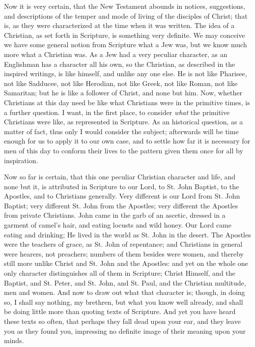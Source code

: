 Now it is very certain, that the New Testament abounds in notices,
suggestions, and descriptions of the temper and mode of living of the
disciples of Christ; that is, as they were characterized at the time
when it was written. The idea of a Christian, as set forth in
Scripture, is something very definite. We may conceive we have some
general notion from Scripture what a Jew was, but we know much more
what a Christian was. As a Jew had a very peculiar character, as an
Englishman has a character all his own, so the Christian, as described
in the inspired writings, is like himself, and unlike any one else. He
is not like Pharisee, not like Sadducee, not like Herodian, not like
Greek, not like Roman, not like Samaritan; but he is like a follower
of Christ, and none but him. Now, whether Christians at this day need
be like what Christians were in the primitive times, is a further
question. I want, in the first place, to consider \emph{what} the primitive
Christians were like, as represented in Scripture. As an historical
question, as a matter of fact, thus only I would consider the subject;
afterwards will be time enough for us to apply it to our own case, and
to settle how far it is necessary for men of this day to conform their
lives to the pattern given them once for all by inspiration.

Now so far is certain, that this one peculiar Christian character
and life, and none but it, is attributed in Scripture to our Lord, to
St. John Baptist, to the Apostles, and to Christians generally. Very
different is our Lord from St. John Baptist; very different St. John
from the Apostles; very different the Apostles from private
Christians. John came in the garb of an ascetic, dressed in a garment
of camel's hair, and eating locusts and wild honey. Our Lord came
eating and drinking; He lived in the world as St. John in the desert.
The Apostles were the teachers of grace, as St. John of repentance;
and Christians in general were hearers, not preachers; numbers of them
besides were women, and thereby still more unlike Christ and St. John
and the Apostles: and yet on the whole one only character
distinguishes all of them in Scripture; Christ Himself, and the
Baptist, and St. Peter, and St. John, and St. Paul, and the Christian
multitude, men and women. And now to draw out what that character is;
though, in doing so, I shall say nothing, my brethren, but what you
know well already, and shall be doing little more than quoting texts
of Scripture. And yet you have heard these texts so often, that
perhaps they fall dead upon your ear, and they leave you as they found
you, impressing no definite image of their meaning upon your minds.

